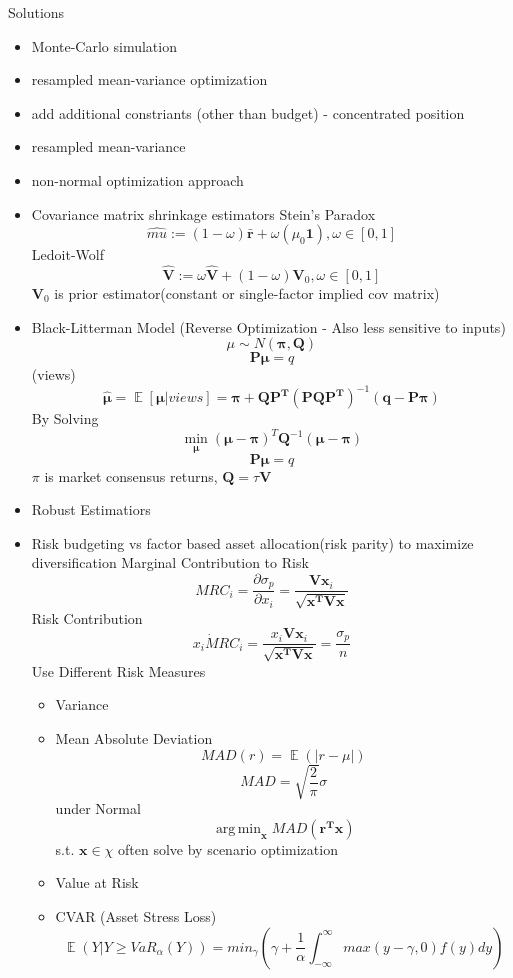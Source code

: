 \documentclass[11pt, openany]{book}              %
\DeclareMathOperator*{\argmin}{arg\,min}  %
\DeclareMathOperator{\E}{\mathbb{E}}
\begin{document}
Solutions
\begin{itemize}
	\item Monte-Carlo simulation
	\item resampled mean-variance optimization
    \item add additional constriants (other than budget) - concentrated position
    \item resampled mean-variance
    \item  non-normal optimization approach
     \item Covariance matrix shrinkage estimators
      \subitem Stein's Paradox 
      $$\hat{mu} := (1-\omega) \bar{\mathbf{r}} + \omega(\mu_0 \mathbf{1}),\omega \in [0,1]$$
      \subitem Ledoit-Wolf
      $$\hat{\mathbf{V}} := \omega\hat{\mathbf{V}} + (1-\omega)\mathbf{V}_0 ,\omega \in [0,1]$$
      $\mathbf{V}_0$ is prior estimator(constant or single-factor implied cov matrix) 
     \item Black-Litterman Model (Reverse Optimization - Also less sensitive to inputs)
     $$ \mu \sim N(\mathbf{\pi}, \mathbf{Q})$$
     $$ \boldsymbol{P\mu} = q$$ (views)
     $$ \hat{\boldsymbol{\mu}} = \E[\boldsymbol{\mu} | views] = \boldsymbol{\pi} + \mathbf{QP^T}(\mathbf{PQP^T})^{-1}(\mathbf{q} - \boldsymbol{P\pi})$$
     By Solving
     $$ \min_{\boldsymbol{\mu}}(\boldsymbol{\mu} - \boldsymbol{\pi})^T \mathbf{Q}^{-1}(\boldsymbol{\mu} - \boldsymbol{\pi}) $$
	$$\boldsymbol{P\mu} = q$$
     $\pi$ is market consensus returns, $\mathbf{Q} = \tau\mathbf{V}$
     \item Robust Estimatiors
     \item  Risk budgeting vs factor based asset allocation(risk parity) to maximize diversification
     \subitem Marginal Contribution to Risk $$MRC_i = \frac{\partial \sigma_p}{\partial x_i} = \frac{\boldsymbol{Vx}_i}{\sqrt{\mathbf{x^TVx}}}$$
     \subitem Risk Contribution $$ x_i \dot MRC_i = \frac{x_i \boldsymbol{Vx}_i}{\sqrt{\mathbf{x^TVx}}} = \frac{\sigma_p}{n}$$
     \subitem Use Different Risk Measures
      \begin{itemize}	
      	\item Variance
      	\item Mean Absolute Deviation $$MAD(r) = \E( |r-\mu|)$$ $$ MAD = \sqrt{\frac{2}{\pi}} \sigma $$ under Normal
      			$$ \argmin_{\mathbf{x}} MAD(\mathbf{r^Tx})$$
      			s.t. $\mathbf{x} \in \chi$ often solve by scenario optimization
      	\item Value at Risk
      	\item CVAR (Asset Stress Loss)
      	$$ \E(Y| Y \geq VaR_{\alpha}(Y)) = min_{\gamma} (\gamma + \frac{1}{\alpha} \int_{-\infty}^{\infty} max(y - \gamma, 0) f(y) dy)$$
      \end{itemize}
\end{itemize}	
\end{document}

